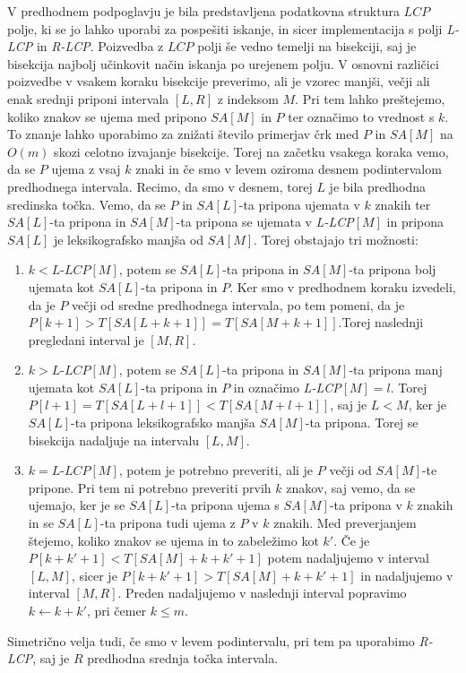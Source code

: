 V predhodnem podpoglavju je bila predstavljena podatkovna struktura $LCP$ polje, ki se jo lahko uporabi za pospešiti iskanje, in sicer implementacija s polji \textit{L-LCP} in \textit{R-LCP}. Poizvedba z $LCP$ polji še vedno temelji na bisekciji, saj je bisekcija najbolj učinkovit način iskanja po urejenem polju. V osnovni različici poizvedbe v vsakem koraku bisekcije preverimo, ali je vzorec manjši, večji ali enak srednji priponi intervala $[L,R]$ z indeksom $M$. Pri tem lahko preštejemo, koliko znakov se ujema med pripono $SA[M]$ in $P$ ter označimo to vrednost s $k$. To znanje lahko uporabimo za znižati število primerjav črk med $P$ in $SA[M]$ na $O(m)$ skozi celotno izvajanje bisekcije. Torej na začetku vsakega koraka vemo, da se $P$ ujema z vsaj $k$ znaki in če smo v levem oziroma desnem podintervalom predhodnega intervala. Recimo, da smo v desnem, torej $L$ je bila predhodna sredinska točka. Vemo, da se $P$ in $SA[L]$-ta pripona ujemata v $k$ znakih ter $SA[L]$-ta pripona in $SA[M]$-ta pripona se ujemata v \textit{L-LCP}$[M]$ in pripona $SA[L]$ je leksikografsko manjša od $SA[M]$. Torej obstajajo tri možnosti:
\begin{enumerate}
    \item $k<\textit{L-LCP}[M]$, potem se $SA[L]$-ta pripona in $SA[M]$-ta pripona bolj ujemata kot $SA[L]$-ta pripona in $P$. Ker smo v predhodnem koraku izvedeli, da je $P$ večji od sredne predhodnega intervala, po tem pomeni, da je $P[k+1]>T[SA[L+k+1]]=T[SA[M+k+1]]$.Torej naslednji pregledani interval je $[M,R]$.
    \item $k>\textit{L-LCP}[M]$, potem se $SA[L]$-ta pripona in $SA[M]$-ta pripona manj ujemata kot $SA[L]$-ta pripona in $P$ in označimo \textit{L-LCP}$[M]=l$. Torej $P[l+1]=T[SA[L+l+1]]<T[SA[M+l+1]]$, saj je $L<M$, ker je $SA[L]$-ta pripona leksikografsko manjša $SA[M]$-ta pripona. Torej se bisekcija nadaljuje na intervalu $[L,M]$.
    \item $k=\textit{L-LCP}[M]$, potem je potrebno preveriti, ali je $P$ večji od $SA[M]$-te pripone. Pri tem ni potrebno preveriti prvih $k$ znakov, saj vemo, da se ujemajo, ker je se $SA[L]$-ta pripona ujema s $SA[M]$-ta pripona v $k$ znakih in se $SA[L]$-ta pripona tudi ujema z $P$ v $k$ znakih. Med preverjanjem štejemo, koliko znakov se ujema in to zabeležimo kot $k'$. Če je $P[k+k'+1]<T[SA[M]+k+k'+1]$ potem nadaljujemo v interval $[L,M]$, sicer je $P[k+k'+1]>T[SA[M]+k+k'+1]$ in nadaljujemo v interval $[M,R]$. Preden nadaljujemo v naslednji interval popravimo $k\leftarrow k+k'$, pri čemer $k\le m$.
\end{enumerate}
Simetrično velja tudi, če smo v levem podintervalu, pri tem pa uporabimo \textit{R-LCP}, saj je $R$ predhodna srednja točka intervala.

